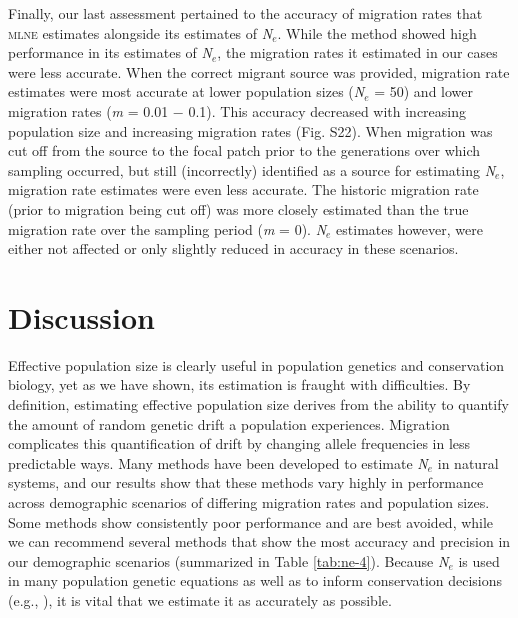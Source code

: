 Finally, our last assessment pertained to the accuracy of migration rates that \textsc{mlne} estimates 
alongside its estimates of \emph{N}$_e$. While the method showed high performance in its estimates of 
\emph{N}$_e$, the migration rates it estimated in our cases were less accurate. When the correct migrant 
source was provided, migration rate estimates were most accurate at lower population sizes (\emph{N}$_e$ = 50) 
and lower migration rates (\emph{m} = 0.01 $-$ 0.1). This accuracy decreased with increasing population size 
and increasing migration rates (Fig. S22). When migration was cut off from the source to the focal patch 
prior to the generations over which sampling occurred, but still (incorrectly) identified as a source for 
estimating \emph{N}$_e$, migration rate estimates were even less accurate. The historic migration rate 
(prior to migration being cut off) was more closely estimated than the true migration rate over the 
sampling period (\emph{m} = 0). \emph{N}$_e$ estimates however, were either not affected or only slightly 
reduced in accuracy in these scenarios.

\section{Discussion}
Effective population size is clearly useful in population genetics and conservation biology, yet as 
we have shown, its estimation is fraught with difficulties. By definition, estimating effective 
population size derives from the ability to quantify the amount of random genetic drift a population 
experiences. Migration complicates this quantification of drift by changing allele frequencies in 
less predictable ways. Many methods have been developed to estimate \emph{N}$_e$ in natural 
systems, and our results show that these methods vary highly in performance across demographic scenarios 
of differing migration rates and population sizes. Some methods show consistently poor performance and 
are best avoided, while we can recommend several methods that show the most accuracy and precision in 
our demographic scenarios (summarized in Table \ref{tab:ne-4}). Because \emph{N}$_e$ is used in many population 
genetic equations as well as to inform conservation decisions (e.g., \citealt{Shaffer:1981, Rieman:2001}), it 
is vital that we estimate it as accurately as possible.

